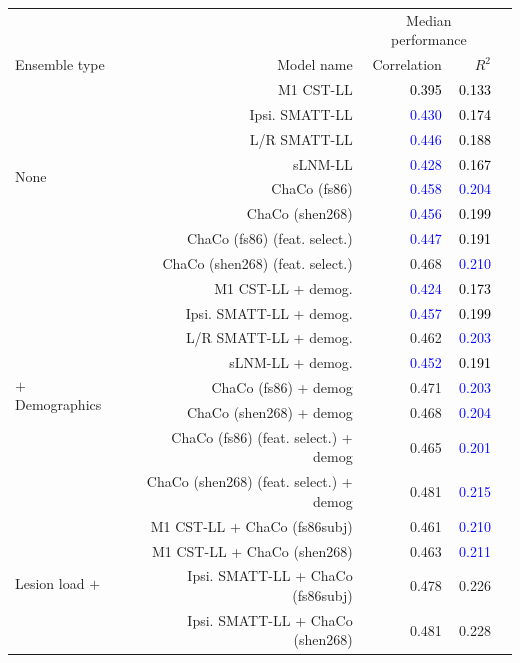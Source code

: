 \documentclass[10pt]{article}
\def\Plus{\texttt{+}}
\newcommand{\colorNavyBlue}[1]{\textcolor{NavyBlue}{#1}}
\newcommand{\colorBlack}[1]{\textcolor{Black}{#1}}
\newcommand{\colorBlue}[1]{\textcolor{Blue}{#1}}
\begin{document}
\begin{table}[h]
\centering
\label{table:5}
\begin{tabular}{lrrrr}
\toprule
 &  & \multicolumn{2}{c}{Median performance} \\
Ensemble type & Model name & Correlation & $R^2$  \\
\midrule
\multirow[t]{8}{*}{None} &  M1 CST-LL & \colorBlack{0.395} & \colorBlack{0.133} \\
 & Ipsi. SMATT-LL & \colorBlue{0.430} & \colorBlack{0.174} \\
 & L/R SMATT-LL & \colorBlue{0.446} & \colorBlack{0.188} \\
 & sLNM-LL & \colorBlue{0.428} & \colorBlack{0.167} \\
 & ChaCo (fs86) & \colorBlue{0.458} & \colorBlue{0.204} \\
 & ChaCo (shen268) & \colorBlue{0.456} & \colorBlack{0.199} \\
 & ChaCo (fs86) (feat. select.) & \colorBlue{0.447} & \colorBlack{0.191} \\
 & ChaCo (shen268) (feat. select.) & \colorNavyBlue{0.468} & \colorBlue{0.210} \\
 \hline
\multirow[t]{8}{*}{$\Plus$ Demographics} & M1 CST-LL + demog. & \colorBlue{0.424} & \colorBlack{0.173} \\
 & Ipsi. SMATT-LL + demog. & \colorBlue{0.457} & \colorBlack{0.199} \\
 & L/R SMATT-LL + demog. & \colorNavyBlue{0.462} & \colorBlue{0.203} \\
 & sLNM-LL + demog. & \colorBlue{0.452} & \colorBlack{0.191} \\
 & ChaCo (fs86) + demog & \colorNavyBlue{0.471} & \colorBlue{0.203} \\
 & ChaCo (shen268) + demog & \colorNavyBlue{0.468} & \colorBlue{0.204} \\
 & ChaCo (fs86) (feat. select.) + demog & \colorNavyBlue{0.465} & \colorBlue{0.201} \\
 & ChaCo (shen268) (feat. select.) + demog & \colorNavyBlue{0.481} & \colorBlue{0.215} \\
 \hline
\multirow[t]{16}{*}{Lesion load $\Plus$} & M1 CST-LL + ChaCo (fs86subj) & \colorNavyBlue{0.461} & \colorBlue{0.210} \\
 ChaCo & M1 CST-LL + ChaCo (shen268) & \colorNavyBlue{0.463} & \colorBlue{0.211} \\
 & Ipsi. SMATT-LL + ChaCo (fs86subj) & \colorNavyBlue{0.478} & \colorNavyBlue{0.226} \\
 & Ipsi. SMATT-LL + ChaCo (shen268) & \colorNavyBlue{0.481} & \colorNavyBlue{0.228} \\

\end{tabular}
\end{table}
\end{document}
